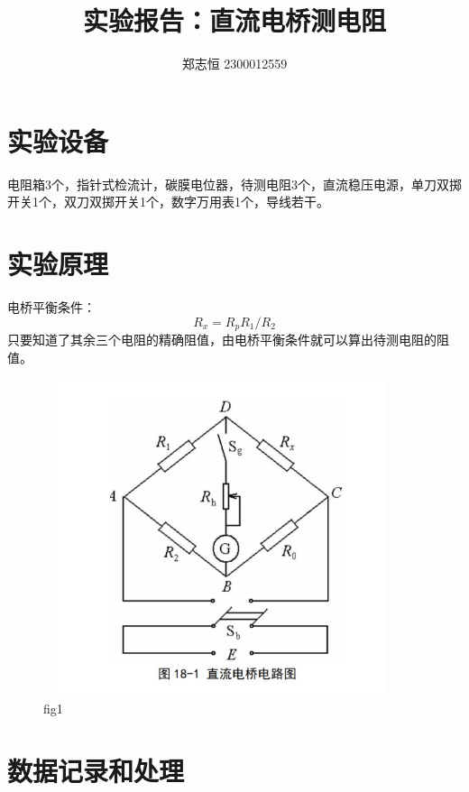 \documentclass[a4paper, 10pt]{article}
\begin{document}
  \title{实验报告：直流电桥测电阻}
  \author{郑志恒 2300012559}
  \maketitle
\section{实验设备}
电阻箱3个，指针式检流计，碳膜电位器，待测电阻3个，直流稳压电源，单刀双掷开关1个，双刀双掷开关1个，数字万用表1个，导线若干。

\section{实验原理}
\noindent 电桥平衡条件：
$$R_x=R_pR_1/R_2$$
只要知道了其余三个电阻的精确阻值，由电桥平衡条件就可以算出待测电阻的阻值。
\begin{figure}[ht]
    \centering 
    \includegraphics[height=9.3cm,width=10.5cm]{p1.png}
    
    \caption{fig1}
    \label{4}
    
    \end{figure}


\section{数据记录和处理}
\end{document}
